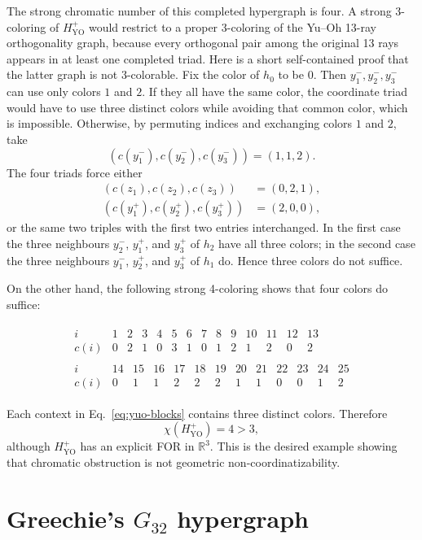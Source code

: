 \documentclass[aps,pra,twocolumn,superscriptaddress,10pt]{revtex4-2}
\newcommand{\R}{\mathbb{R}}
\newcommand{\YO}{\mathrm{YO}}
\begin{document}
The strong chromatic number of this completed hypergraph is four.  A strong
3-coloring of $H_{\YO}^{+}$ would restrict to a proper 3-coloring of the
Yu--Oh 13-ray orthogonality graph, because every orthogonal pair among the
original 13 rays appears in at least one completed triad.  Here is a short
self-contained proof that the latter graph is not 3-colorable.  Fix the color
of $h_0$ to be $0$.  Then $y_1^-,y_2^-,y_3^-$ can use only colors $1$ and $2$.
If they all have the same color, the coordinate triad would have to use three
distinct colors while avoiding that common color, which is impossible.
Otherwise, by permuting indices and exchanging colors $1$ and $2$, take
\[
 (c(y_1^-),c(y_2^-),c(y_3^-))=(1,1,2).
\]
The four triads force either
\begin{align*}
 (c(z_1),c(z_2),c(z_3))&=(0,2,1),\\
 (c(y_1^+),c(y_2^+),c(y_3^+))&=(2,0,0),
\end{align*}
or the same two triples with the first two entries interchanged.  In the
first case the three neighbours $y_2^-$, $y_1^+$, and $y_3^+$ of $h_2$ have
all three colors; in the second case the three neighbours $y_1^-$, $y_2^+$,
and $y_3^+$ of $h_1$ do.  Hence three colors do not suffice.

On the other hand, the following strong 4-coloring shows that four colors do
suffice:
\begin{widetext}
\begin{align}\label{eq:yuo-coloring}
\begin{array}{c|rrrrrrrrrrrrr}
 i    &1&2&3&4&5&6&7&8&9&10&11&12&13\\ \hline
 c(i) &0&2&1&0&3&1&0&1&2&1&2&0&2
\end{array}
\\[1ex]
\begin{array}{c|rrrrrrrrrrrr}
 i    &14&15&16&17&18&19&20&21&22&23&24&25\\ \hline
 c(i) &0&1&1&2&2&2&1&1&0&0&1&2
\end{array}
\end{align}
\end{widetext}
Each context in Eq.~\eqref{eq:yuo-blocks} contains three distinct colors.
Therefore
\[
    \chi(H_{\YO}^{+})=4>3,
\]
although $H_{\YO}^{+}$ has an explicit FOR in $\R^3$.  This is the desired
example showing that chromatic obstruction is not geometric
non-coordinatizability.

\section{Greechie's \texorpdfstring{$G_{32}$}{G32} hypergraph}\label{sec:g32}
\end{document}
